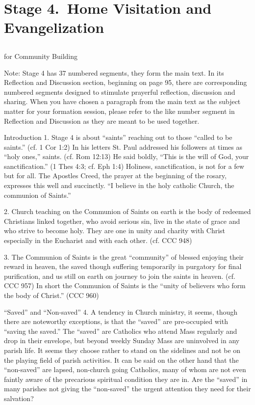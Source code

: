 \documentclass[oneside]{book}
\begin{document}

\chapter{Stage 4.\ Home Visitation and Evangelization}

\section*{} 

for Community Building

Note: Stage 4 has 37 numbered segments, they form the main text. In its
Reflection and Discussion section, beginning on page 95, there are corresponding
numbered segments designed to stimulate prayerful reflection, discussion and
sharing. When you have chosen a paragraph from the main text as the subject
matter for your formation session, please refer to the like number segment in
Reflection and Discussion as they are meant to be used together.

Introduction
1. Stage 4 is about ``saints'' reaching out to those ``called to be saints.''
(cf. 1 Cor 1:2) In his letters St. Paul addressed his followers at times as
``holy ones,'' saints. (cf. Rom 12:13) He said boldly, ``This is the will of
God, your sanctification.'' (1 Thes 4:3; cf. Eph 1:4) Holiness, sanctification,
is not for a few but for all. The Apostles Creed, the prayer at the beginning of
the rosary, expresses this well and succinctly. ``I believe in the holy catholic
Church, the communion of Saints.''

2. Church teaching on the Communion of Saints on earth is the body of redeemed
Christians linked together, who avoid serious sin, live in the state of grace
and who strive to become holy. They are one in unity and charity with Christ
especially in the Eucharist and with each other. (cf. CCC 948)

3. The Communion of Saints is the great ``community'' of blessed enjoying their
reward in heaven, the saved though suffering temporarily in purgatory for final
purification, and us still on earth on journey to join the saints in
heaven. (cf. CCC 957) In short the Communion of Saints is the ``unity of
believers who form the body of Christ.'' (CCC 960)

``Saved'' and ``Non-saved''
4. A tendency in Church ministry, it seems, though there are noteworthy
exceptions, is that the ``saved'' are pre-occupied with ``saving the saved.''
The ``saved'' are Catholics who attend Mass regularly and drop in their
envelope, but beyond weekly Sunday Mass are uninvolved in any parish life. It
seems they choose rather to stand on the sidelines and not be on the playing
field of parish activities. It can be said on the other hand that the
``non-saved'' are lapsed, non-church going Catholics, many of whom are not even
faintly aware of the precarious spiritual condition they are in. Are the
``saved'' in many parishes not giving the ``non-saved'' the urgent attention
they need for their salvation?
\end{document}
